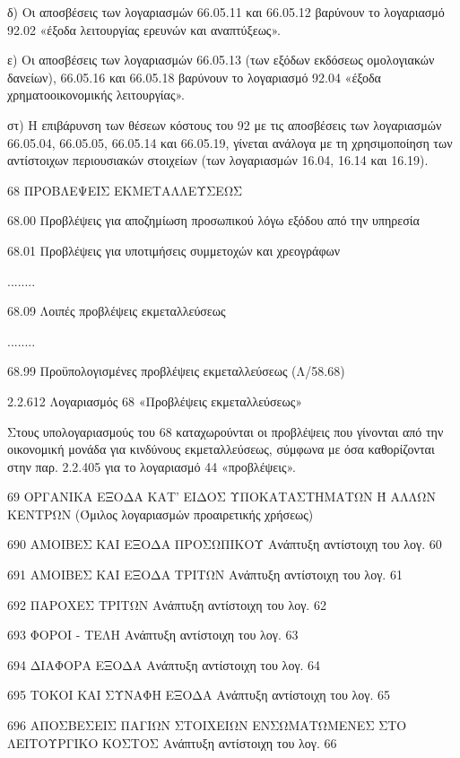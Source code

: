 \documentclass[A4,10pt,greek]{book}
\begin{document}
δ) Οι αποσβέσεις των λογαριασμών 66.05.11 και 66.05.12 βαρύνουν το λογαριασμό 92.02 «έξοδα λειτουργίας ερευνών και αναπτύξεως».

ε) Οι αποσβέσεις των λογαριασμών 66.05.13 (των εξόδων εκδόσεως ομολογιακών δανείων), 66.05.16 και 66.05.18 βαρύνουν το λογαριασμό 92.04 «έξοδα χρηματοοικονομικής λειτουργίας».

στ) Η επιβάρυνση των θέσεων κόστους του 92 με τις αποσβέσεις των λογαριασμών 66.05.04, 66.05.05, 66.05.14 και 66.05.19, γίνεται ανάλογα με τη χρησιμοποίηση των αντίστοιχων περιουσιακών στοιχείων (των λογαριασμών 16.04, 16.14 και 16.19).

68   ΠΡΟΒΛΕΨΕΙΣ ΕΚΜΕΤΑΛΛΕΥΣΕΩΣ

        68.00   Προβλέψεις για αποζημίωση προσωπικού λόγω εξόδου
                     από την υπηρεσία

        68.01   Προβλέψεις για υποτιμήσεις συμμετοχών και χρεογράφων

        ........

        68.09    Λοιπές προβλέψεις εκμεταλλεύσεως

        ........

        68.99    Προϋπολογισμένες προβλέψεις εκμεταλλεύσεως (Λ/58.68)

2.2.612 Λογαριασμός 68 «Προβλέψεις εκμεταλλεύσεως»

Στους υπολογαριασμούς του 68 καταχωρούνται οι προβλέψεις που γίνονται από την οικονομική μονάδα για κινδύνους εκμεταλλεύσεως, σύμφωνα με όσα καθορίζονται στην παρ. 2.2.405 για το λογαριασμό 44 «προβλέψεις».

 69   ΟΡΓΑΝΙΚΑ ΕΞΟΔΑ ΚΑΤ' ΕΙΔΟΣ ΥΠΟΚΑΤΑΣΤΗΜΑΤΩΝ
         Ή ΑΛΛΩΝ ΚΕΝΤΡΩΝ
        (Όμιλος λογαριασμών προαιρετικής χρήσεως)

        690    ΑΜΟΙΒΕΣ ΚΑΙ ΕΞΟΔΑ ΠΡΟΣΩΠΙΚΟΥ
                  Ανάπτυξη αντίστοιχη του λογ. 60

        691    ΑΜΟΙΒΕΣ ΚΑΙ ΕΞΟΔΑ ΤΡΙΤΩΝ
                  Ανάπτυξη αντίστοιχη του λογ. 61

        692    ΠΑΡΟΧΕΣ ΤΡΙΤΩΝ
                  Ανάπτυξη αντίστοιχη του λογ. 62

        693    ΦΟΡΟΙ - ΤΕΛΗ
                  Ανάπτυξη αντίστοιχη του λογ. 63

        694    ΔΙΑΦΟΡΑ ΕΞΟΔΑ
                  Ανάπτυξη αντίστοιχη του λογ. 64

        695    ΤΟΚΟΙ ΚΑΙ ΣΥΝΑΦΗ ΕΞΟΔΑ
                  Ανάπτυξη αντίστοιχη του λογ. 65

        696    ΑΠΟΣΒΕΣΕΙΣ ΠΑΓΙΩΝ ΣΤΟΙΧΕΙΩΝ ΕΝΣΩΜΑΤΩΜΕΝΕΣ
                  ΣΤΟ ΛΕΙΤΟΥΡΓΙΚΟ ΚΟΣΤΟΣ
                  Ανάπτυξη αντίστοιχη του λογ. 66
\end{document}
